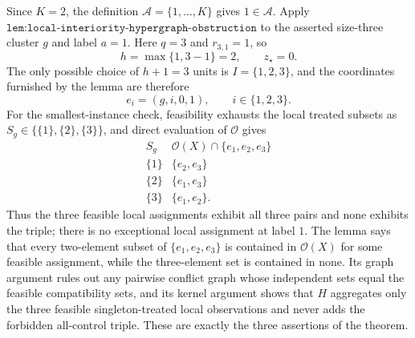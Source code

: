 Since \(K=2\), the definition \(\mathcal A=\{1,\ldots,K\}\) gives \(1\in\mathcal A\).  Apply \(\texttt{lem:local-interiority-hypergraph-obstruction}\) to the asserted size-three cluster \(g\) and label \(a=1\).  Here \(q=3\) and \(r_{3,1}=1\), so
\[
 h=\max\{1,3-1\}=2,
 \qquad z_\star=0.
\]
The only possible choice of \(h+1=3\) units is \(I=\{1,2,3\}\), and the coordinates furnished by the lemma are therefore
\[
 e_i=(g,i,0,1),\qquad i\in\{1,2,3\}.
\]
For the smallest-instance check, feasibility exhausts the local treated subsets as \(S_g\in\{\{1\},\{2\},\{3\}\}\), and direct evaluation of \(\mathcal O\) gives
\[
\begin{array}{c|c}
S_g&\mathcal O(X)\cap\{e_1,e_2,e_3\}\\ \hline
\{1\}&\{e_2,e_3\}\\
\{2\}&\{e_1,e_3\}\\
\{3\}&\{e_1,e_2\}.
\end{array}
\]
Thus the three feasible local assignments exhibit all three pairs and none exhibits the triple; there is no exceptional local assignment at label \(1\).
The lemma says that every two-element subset of \(\{e_1,e_2,e_3\}\) is contained in \(\mathcal O(X)\) for some feasible assignment, while the three-element set is contained in none.  Its graph argument rules out any pairwise conflict graph whose independent sets equal the feasible compatibility sets, and its kernel argument shows that \(H\) aggregates only the three feasible singleton-treated local observations and never adds the forbidden all-control triple.  These are exactly the three assertions of the theorem.
